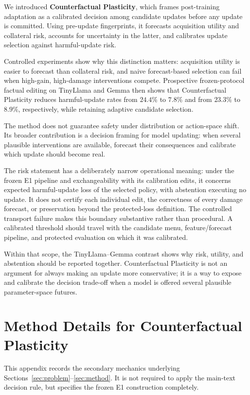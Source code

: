 \documentclass{article} %
\begin{document}
We introduced \textbf{Counterfactual Plasticity}, which frames post-training adaptation as a calibrated decision among candidate updates before any update is committed. Using pre-update fingerprints, it forecasts acquisition utility and collateral risk, accounts for uncertainty in the latter, and calibrates update selection against harmful-update risk.

Controlled experiments show why this distinction matters: acquisition utility is easier to forecast than collateral risk, and naive forecast-based selection can fail when high-gain, high-damage interventions compete. Prospective frozen-protocol factual editing on TinyLlama and Gemma then shows that Counterfactual Plasticity reduces harmful-update rates from $24.4\%$ to $7.8\%$ and from $23.3\%$ to $8.9\%$, respectively, while retaining adaptive candidate selection.

The method does not guarantee safety under distribution or action-space shift. Its broader contribution is a decision framing for model updating: when several plausible interventions are available, forecast their consequences and calibrate which update should become real.

The risk statement has a deliberately narrow operational meaning: under the
frozen E1 pipeline and exchangeability with its calibration edits, it concerns
expected harmful-update loss of the selected policy, with abstention executing
no update. It does not certify each individual edit, the correctness of every
damage forecast, or preservation beyond the protected-loss definition. The
controlled transport failure makes this boundary substantive rather than
procedural. A calibrated threshold should travel with the candidate menu,
feature/forecast pipeline, and protected evaluation on which it was calibrated.

Within that scope, the TinyLlama--Gemma contrast shows why risk, utility, and
abstention should be reported together. Counterfactual Plasticity is not an
argument for always making an update more conservative; it is a way to expose
and calibrate the decision trade-off when a model is offered several plausible
parameter-space futures.

\appendix
\section{Method Details for Counterfactual Plasticity}
\label{app:method_details}

This appendix records the secondary mechanics underlying
Sections~\ref{sec:problem}--\ref{sec:method}. It is not required to apply the
main-text decision rule, but specifies the frozen E1 construction completely.
\end{document}
